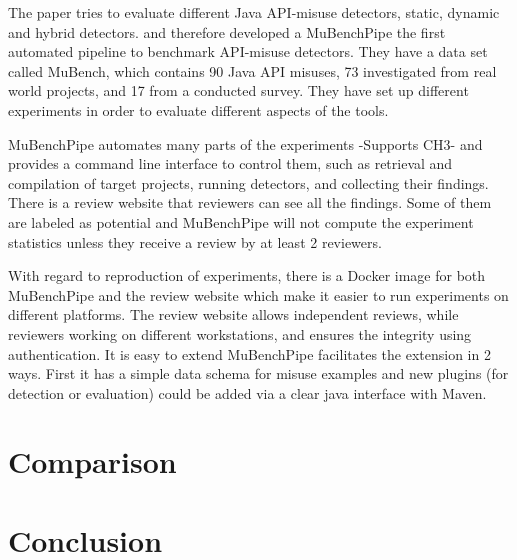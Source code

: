 \documentclass[authoryear,preprint]{sigplanconf}
\begin{document}
The paper tries to evaluate different Java API-misuse detectors, static, dynamic and hybrid detectors. and therefore developed a MuBenchPipe \cite{8338426} the first automated pipeline to benchmark API-misuse detectors. They have a data set called MuBench, which contains 90 Java API misuses, 73 investigated from real world projects, and 17 from a conducted survey. They have set up different experiments in order to evaluate different aspects of the tools. 

MuBenchPipe automates many parts of the experiments -Supports CH3- and provides a command line interface to control them, such as retrieval and compilation of target projects, running detectors, and collecting their findings. There is a review website that reviewers can see all the findings. Some of them are labeled as potential and MuBenchPipe will not compute the experiment statistics unless they receive a review by at least 2 reviewers. 

With regard to reproduction of experiments, there is a Docker image for both MuBenchPipe and the review website which make it easier to run experiments on different platforms. The review website allows independent reviews, while reviewers working on different workstations, and ensures the integrity using authentication. It is easy to extend MuBenchPipe facilitates the extension in 2 ways. First it has a simple data schema for misuse examples and new plugins (for detection or evaluation) could be added via a clear java interface with Maven. 

\section{Comparison}


\begin{table}[]
	\centering
	\captionsetup{justification=centering}
	\caption{My caption}
	\label{my-label}
\end{table}


\section{Conclusion}



\end{document}

